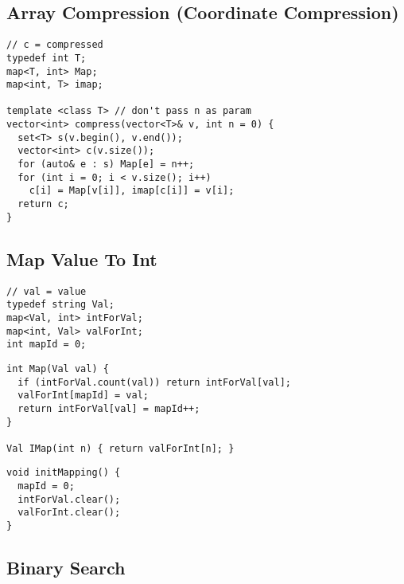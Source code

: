\documentclass[twoside]{article}
\newcommand{\fileTitleStyle}{\large\underline}
\begin{document}
\begin{multicols*}{2}
\subsection*{Array Compression (Coordinate Compression)}
\begin{verbatim}
// c = compressed
typedef int T;
map<T, int> Map;
map<int, T> imap;

template <class T> // don't pass n as param
vector<int> compress(vector<T>& v, int n = 0) {
  set<T> s(v.begin(), v.end());
  vector<int> c(v.size());
  for (auto& e : s) Map[e] = n++;
  for (int i = 0; i < v.size(); i++)
    c[i] = Map[v[i]], imap[c[i]] = v[i];
  return c;
}
\end{verbatim}

\subsectionfont{\centering\bfseries\LARGE}
\subsectionfont{\fileTitleStyle}
\subsection*{Map Value To Int}
\begin{verbatim}
// val = value
typedef string Val;
map<Val, int> intForVal;
map<int, Val> valForInt;
int mapId = 0;
\end{verbatim}
\vspace{-12pt}
\begin{verbatim}
int Map(Val val) {
  if (intForVal.count(val)) return intForVal[val];
  valForInt[mapId] = val;
  return intForVal[val] = mapId++;
}

Val IMap(int n) { return valForInt[n]; }
\end{verbatim}
\vspace{-12pt}
\begin{verbatim}
void initMapping() {
  mapId = 0;
  intForVal.clear();
  valForInt.clear();
}
\end{verbatim}

\subsectionfont{\centering\bfseries\LARGE}
\vspace{0em}
\subsection*{Binary Search}
\vspace{2em}
\subsubsectionfont{\centering\bfseries\Large}
\subsubsectionfont{\fileTitleStyle}

\end{multicols*}
\end{document}
